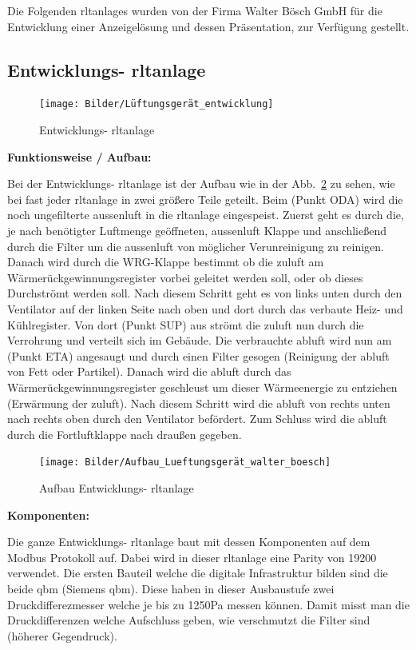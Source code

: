 Die Folgenden \acp{rltanlage} wurden von der Firma Walter Bösch GmbH für die Entwicklung einer Anzeigelösung und dessen Präsentation, zur Verfügung gestellt.

\subsection{Entwicklungs- \ac{rltanlage}}

\begin{figure}[H]
	\centering
	\texttt{[image: Bilder/Lüftungsgerät\_entwicklung]}
	\caption{Entwicklungs- \ac{rltanlage}} 
	\label{fig:LG_entwicklung}
\end{figure}

\textbf{Funktionsweise / Aufbau:}

Bei der Entwicklungs- \ac{rltanlage} ist der Aufbau wie in der Abb.~\ref{fig:Bauplan_entwicklung} zu sehen, wie bei fast jeder \ac{rltanlage} in zwei größere Teile geteilt.
Beim (Punkt ODA) wird die noch ungefilterte \gls{aussenluft} in die \ac{rltanlage} eingespeist. Zuerst geht es durch die, je nach benötigter Luftmenge geöffneten, \gls{aussenluft} Klappe und anschließend durch die Filter um die \gls{aussenluft} von möglicher Verunreinigung zu reinigen. Danach wird durch die WRG-Klappe bestimmt ob die \gls{zuluft} am Wärmerückgewinnungsregister vorbei geleitet werden soll, oder ob dieses Durchströmt werden soll. Nach diesem Schritt geht es von links unten durch den Ventilator auf der linken Seite nach oben und dort durch das verbaute Heiz- und Kühlregister. Von dort (Punkt SUP) aus strömt die \gls{zuluft} nun durch die Verrohrung und verteilt sich im Gebäude. Die verbrauchte \gls{abluft} wird nun am (Punkt ETA) angesaugt und durch einen Filter gesogen (Reinigung der \gls{abluft} von \zB Fett oder Partikel). Danach wird die \gls{abluft} durch das Wärmerückgewinnungsregister geschleust um dieser Wärmeenergie zu entziehen (Erwärmung der \gls{zuluft}). Nach diesem Schritt wird die \gls{abluft} von rechts unten nach rechts oben durch den Ventilator befördert. Zum Schluss wird die \gls{abluft} durch die Fortluftklappe nach draußen gegeben. 

\begin{figure}[H]
	\centering
	\texttt{[image: Bilder/Aufbau\_Lueftungsgerät\_walter\_boesch]}
	\caption{Aufbau Entwicklungs- \ac{rltanlage}} 
	\label{fig:Bauplan_entwicklung}
\end{figure}


\textbf{Komponenten:}

Die ganze Entwicklungs- \ac{rltanlage} baut mit dessen Komponenten auf dem Modbus Protokoll auf. Dabei wird in dieser \ac{rltanlage} eine Parity von 19200 verwendet. Die ersten Bauteil welche die digitale Infrastruktur bilden sind die beide \gls{qbm}  (Siemens \gls{qbm}). Diese haben in dieser Ausbaustufe zwei Druckdifferezmesser welche je bis zu 1250Pa messen können. Damit misst man die Druckdifferenzen welche Aufschluss geben, wie verschmutzt die Filter sind (höherer Gegendruck).

